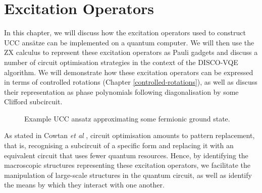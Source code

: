 \chapter{Excitation Operators}%
\label{excitation-operators}

In this chapter, we will discuss how the excitation operators used to construct UCC ansätze can be implemented on a quantum computer. We will then use the ZX calculus to represent these excitation operators as Pauli gadgets and discuss a number of circuit optimisation strategies in the context of the DISCO-VQE algorithm. We will demonstrate how these excitation operators can be expressed in terms of controlled rotations (Chapter \ref{controlled-rotations}), as well as discuss their representation as phase polynomials following diagonalisation by some Clifford subcircuit. 

\begin{figure}[H]
    \centering
    \caption{Example UCC ansatz approximating some fermionic ground state.}
\end{figure}

As stated in Cowtan \textit{et al} \cite{Cowtan2020}, circuit optimisation amounts to pattern replacement, that is, recognising a subcircuit of a specific form and replacing it with an equivalent circuit that uses fewer quantum resources. Hence, by identifying the macroscopic structures representing these excitation operators, we facilitate the manipulation of large-scale structures in the quantum circuit, as well as identify the means by which they interact with one another.
